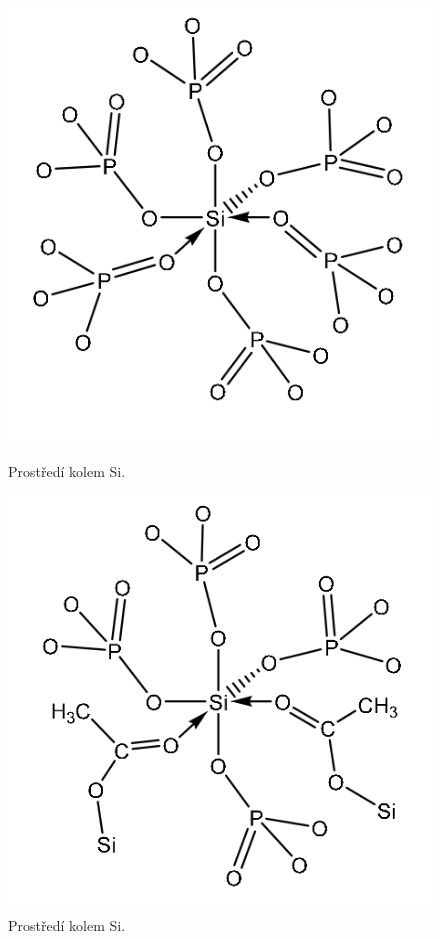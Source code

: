 \documentclass[
  printed, %
  table,   %
  lof,     %
  lot,     %
  oneside,
]{fithesis3}
\begin{document}
\begin{otherlanguage}{czech}
\begin{figure}
\centering
\begin{minipage}{.45\linewidth}
  \includegraphics[width=\linewidth]{si_koordinovane_6_P.png}
  \caption{Prostředí kolem Si. \cite{Styskalik2015thesis}}
  \label{img1}
\end{minipage}
\hspace{.05\linewidth}
\begin{minipage}{.45\linewidth}
  \includegraphics[width=\linewidth]{si_koordinovany_6_C.png}
  \caption{Prostředí kolem Si. \cite{Styskalik2015thesis}}
  \label{img2}
\end{minipage}
\end{figure}


\end{otherlanguage}
\end{document}
